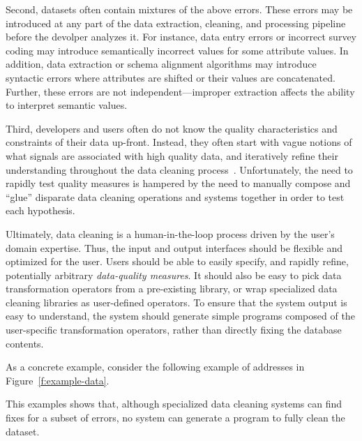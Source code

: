 Second, datasets often contain mixtures of the above errors.  These errors may be introduced at any part of the data extraction, cleaning, and processing pipeline before the devolper analyzes it.  For instance, data entry errors or incorrect survey coding may introduce semantically incorrect values for some attribute values.  In addition, data extraction or schema alignment algorithms may introduce syntactic errors where attributes are shifted or their values are concatenated.  Further, these errors are not independent---improper extraction affects the ability to interpret semantic values.  

Third, developers and users often do not know the quality characteristics and constraints of their data up-front.  Instead, they often start with vague notions of what signals are associated with high quality data, and iteratively refine their understanding throughout the data cleaning process~\cite{}.  Unfortunately, the need to rapidly test quality measures is hampered by the need to manually compose and ``glue'' disparate data cleaning operations and systems together in order to test each hypothesis.  


Ultimately, data cleaning is a human-in-the-loop process driven by the user's domain expertise.  Thus, the input and output interfaces should be flexible and optimized for the user.   Users should be able to easily specify, and rapidly refine, potentially arbitrary {\it data-quality measures}.  It should also be easy to pick data transformation operators from a pre-existing library, or wrap specialized data cleaning libraries as user-defined operators.  To ensure that the system output is easy to understand, the system should generate simple programs composed of the user-specific transformation operators, rather than directly fixing the database contents.

As a concrete example, consider the following example of addresses in Figure~\ref{f:example-data}.  

This examples shows that, although specialized data cleaning systems can find fixes for a subset of errors, no system can generate a program to fully clean the dataset.  


